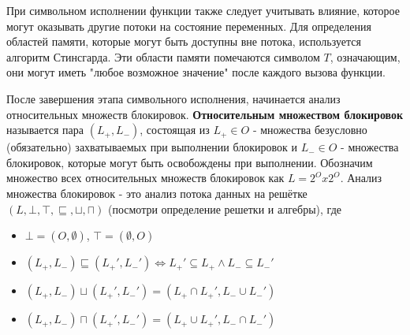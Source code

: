 При символьном исполнении функции также следует учитывать влияние, которое могут оказывать другие потоки на состояние переменных. Для определения областей памяти, которые могут быть доступны вне потока, используется алгоритм Стинсгарда. Эти области памяти помечаются символом $T$, означающим, они могут иметь "любое возможное значение" после каждого вызова функции.

После завершения этапа символьного исполнения, начинается анализ относительных множеств блокировок. \textbf{Относительным множеством блокировок} называется пара $(L_{+}, L_{-})$, состоящая из $L_{+} \in O$ - множества безусловно (обязательно) захватываемых при выполнении блокировок и $L_{-} \in O$ - множества блокировок, которые могут быть освобождены при выполнении. Обозначим множество всех относительных множеств блокировок как $L = 2^{O} x 2^{O}$. Анализ множества блокировок - это анализ потока данных на решётке $(L, \bot, \top, \sqsubseteq, \sqcup, \sqcap)$ (посмотри определение решетки  и алгебры), где
\begin{itemize}
\item $\bot = (O, \emptyset)$, $\top = (\emptyset, O)$
\item $(L_{+}, L_{-}) \sqsubseteq (L_{+}', L_{-}') \Longleftrightarrow L_{+}' \subseteq L_{+} \wedge L_{-} \subseteq L_{-}'$
\item $(L_{+}, L_{-}) \sqcup (L_{+}', L_{-}') = (L_{+} \cap L_{+}', L_{-} \cup L_{-}')$
\item $(L_{+}, L_{-}) \sqcap (L_{+}', L_{-}') = (L_{+} \cup L_{+}', L_{-} \cap L_{-}')$
\end{itemize}


